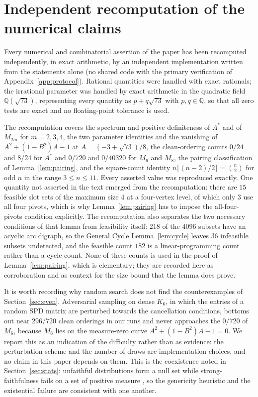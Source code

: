\documentclass[11pt]{article}
\theoremstyle{plain}
\theoremstyle{definition}
\begin{document}
\section{Independent recomputation of the numerical claims}\label{app:recheck}
\begin{humanblock}
Every numerical and combinatorial assertion of the paper has been recomputed
independently, in exact arithmetic, by an independent implementation written from the
statements alone (no shared code with the primary verification of
Appendix~\ref{app:protocol}). Rational quantities were handled with exact
rationals; the irrational parameter was handled by exact arithmetic in the
quadratic field $\mathbb{Q}(\sqrt{73})$, representing every quantity as
$p+q\sqrt{73}$ with $p,q\in\mathbb{Q}$, so that all zero tests are exact and no
floating-point tolerance is used.

The recomputation covers the spectrum and positive definiteness of $A^*$ and of $M_{2m}$ for
$m=2,3,4$, the two parameter identities and the vanishing of $A^2+(1-B^2)A-1$ at
$A=(-3+\sqrt{73})/8$, the clean-ordering counts $0/24$ and $8/24$ for $A^*$ and $0/720$ and $0/40320$
for $M_6$ and $M_8$, the pairing classification of Lemma~\ref{lem:pairing}, and the square-count identity
$n\lceil(n-2)/2\rceil=\binom{n}{2}$ for odd $n$ in the range $3\le n\le11$. Every asserted value was
reproduced exactly. One quantity not asserted in the text emerged from the recomputation: there are
$15$ feasible slot sets of the maximum size $4$ at a four-vertex level, of which only $3$ use all four
pivots, which is why Lemma~\ref{lem:pairing} has to impose the all-four-pivots condition explicitly.
The recomputation also separates the two necessary conditions of that lemma from feasibility
itself: $218$ of the $4096$ subsets have an acyclic arc digraph, so the General Cycle
Lemma~\ref{lem:cycle} leaves $36$ infeasible subsets undetected, and the feasible count $182$ is a
linear-programming count rather than a cycle count. None of these counts is used in
the proof of Lemma~\ref{lem:pairing}, which is elementary; they are recorded here as
corroboration and as context for the size bound that the lemma does prove.

It is worth recording why random search does not find the counterexamples of
Section~\ref{sec:even}. Adversarial sampling on dense $K_6$, in which the entries of a random SPD matrix are
perturbed towards the cancellation conditions, bottoms out near $296/720$ clean orderings in our runs
and never approaches the $0/720$ of $M_6$, because $M_6$ lies on the measure-zero curve $A^2+(1-B^2)A-1=0$. We report this as an
indication of the difficulty rather than as evidence: the perturbation scheme and the number of draws
are implementation choices, and no claim in this paper depends on them. This is the coexistence noted
in Section~\ref{sec:stats}: unfaithful distributions form a null set while strong-faithfulness fails on
a set of positive measure \cite{Uhler}, so the genericity heuristic and the existential failure are
consistent with one another.


\end{humanblock}
\end{document}
